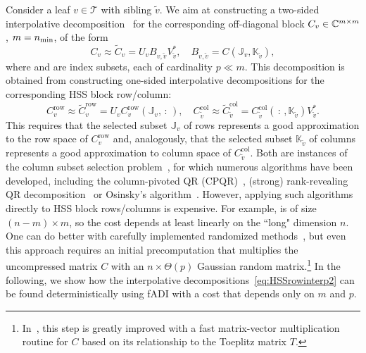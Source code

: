 Consider a leaf $v \in \mathcal T$ with sibling $\tilde v$. We aim at constructing 
a two-sided interpolative decomposition~\cite{cheng2005compression} for the corresponding off-diagonal block $C_v \in \mathbb{C}^{m \times m}$, $m = n_{\min}$, of the form
\begin{equation}
\label{eq:block_factors}
 C_v \approx \widetilde{C}_v = U_v B_{v, \tilde{v}} V_{\tilde{v}}^*, \quad B_{v, \tilde{v}} = C(\mathbb{J}_v, \mathbb{K}_{\tilde{v}}),
 \end{equation} 
where  and  are index subsets, each of cardinality $p \ll m$. This decomposition is obtained from constructing one-sided 
interpolative decompositions for the corresponding HSS block row/column:
\begin{equation} 
\label{eq:HSSrowinterp2} 
C_v^{\mathrm{row}} \approx \widetilde{C}_v^{\mathrm{row}}  = U_v  C_v^{\mathrm{row}}(\mathbb{J}_v, \, :\,), \quad 
C_{\tilde v}^{\mathrm{col}} \approx \widetilde{C}_{\tilde v}^{\mathrm{col}}  = C_{\tilde v}^{\mathrm{col}}(\, :\,, \mathbb K_{\tilde v}) V_{\tilde v}^*.
\end{equation}
This requires that the selected subset $\mathbb{J}_v$ of rows represents a good approximation 
to the row space of $C_v^{\mathrm{row}}$
and, analogously, that the 
selected subset $\mathbb{K}_{\tilde v}$ of columns represents a good approximation 
to column space of $C_{\tilde v}^{\mathrm{col}}$. Both are instances of the column subset selection problem~\cite{broadbent2010subset}, for which numerous algorithms have been developed, including 
the column-pivoted QR (CPQR)~\cite{GolubVanLoan2013}, (strong) rank-revealing QR decomposition~\cite{gu1996efficient} or Osinsky's algorithm~\cite{Osinsky2023}.
However, applying such algorithms directly to HSS block rows/columns is expensive. For example,  is of size \hbox{$(n\!-\!m) \times m$}, so the cost depends at least linearly on the ``long" dimension $n$.  One can do better with carefully implemented randomized methods~\cite{martinsson2011fast,xia2012superfast}, but even this approach requires an initial precomputation that multiplies the uncompressed matrix $C$ with an $n \times \Theta(p)$ Gaussian random matrix.\footnote{In~\cite{xia2012superfast}, this step is greatly improved with a fast matrix-vector multiplication routine for $C$ based on its relationship to the Toeplitz matrix $T$.} 
In the following, we show how the interpolative decompositions~\eqref{eq:HSSrowinterp2} 
can be found deterministically using fADI with a cost that depends only on $m$ and $p$.


